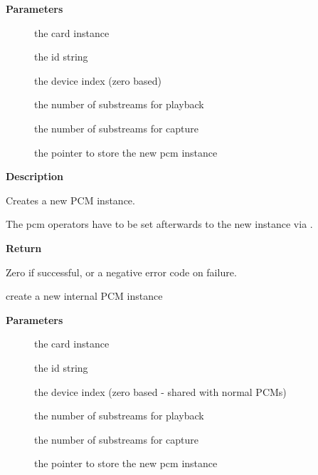 \documentclass[a4paper,8pt,english]{sphinxmanual}
\begin{document}
\textbf{Parameters}
\begin{description}
\item[{}] \leavevmode
the card instance

\item[{}] \leavevmode
the id string

\item[{}] \leavevmode
the device index (zero based)

\item[{}] \leavevmode
the number of substreams for playback

\item[{}] \leavevmode
the number of substreams for capture

\item[{}] \leavevmode
the pointer to store the new pcm instance

\end{description}

\textbf{Description}

Creates a new PCM instance.

The pcm operators have to be set afterwards to the new instance
via .

\textbf{Return}

Zero if successful, or a negative error code on failure.

\begin{fulllineitems}
\label{sound/kernel-api/alsa-driver-api:c.snd_pcm_new_internal}
create a new internal PCM instance

\end{fulllineitems}


\textbf{Parameters}
\begin{description}
\item[{}] \leavevmode
the card instance

\item[{}] \leavevmode
the id string

\item[{}] \leavevmode
the device index (zero based - shared with normal PCMs)

\item[{}] \leavevmode
the number of substreams for playback

\item[{}] \leavevmode
the number of substreams for capture

\item[{}] \leavevmode
the pointer to store the new pcm instance

\end{description}
\end{document}
